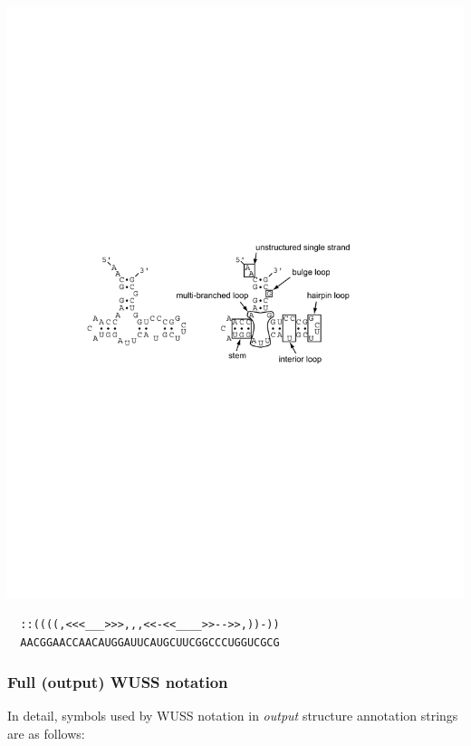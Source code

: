 \begin{center}
\includegraphics[scale=0.8]{Figures/rna_elements}
\end{center}
\begin{center}
\begin{BVerbatim}
  ::((((,<<<___>>>,,,<<-<<____>>-->>,))-))
  AACGGAACCAACAUGGAUUCAUGCUUCGGCCCUGGUCGCG
\end{BVerbatim}
\end{center}

\subsubsection{Full (output) WUSS notation}

In detail, symbols used by WUSS notation in \emph{output} structure
annotation strings are as follows:

